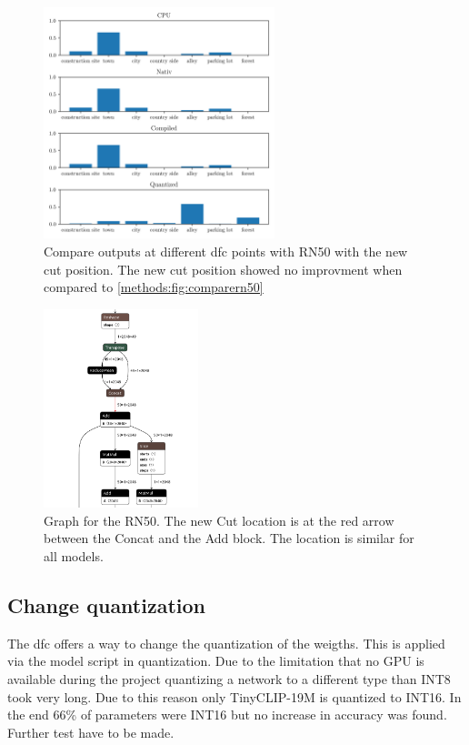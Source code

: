 \begin{figure}[]
    \centering
    \includegraphics[width=0.6\textwidth]{Images/Implementation/compareProbs_newCut_RN50.png}
    \caption{Compare outputs at different \acrshort{dfc} points with RN50 with the new cut position. The new cut position showed no improvment when compared to \cref{methods:fig:comparern50}}
    \label{methods:fig:comparern50newcut}
\end{figure}

\begin{figure}[]
    \centering
    \includegraphics[width=0.4\textwidth]{Images/Implementation/secondcutlocation.png}
    \caption{Graph for the RN50. The new Cut location is at the red arrow between the Concat and the Add block.
    The location is similar for all models.}
    \label{methods:fig:rn50newcut}
\end{figure}

\subsection{Change quantization}

The \acrshort{dfc} offers a way to change the quantization of the weigths.
This is applied via the model script in quantization.
Due to the limitation that no GPU is available during the project quantizing a network to a different type than INT8 took very long.
Due to this reason only TinyCLIP-19M is quantized to INT16.
In the end 66\% of parameters were INT16 but no increase in accuracy was found.
Further test have to be made.
